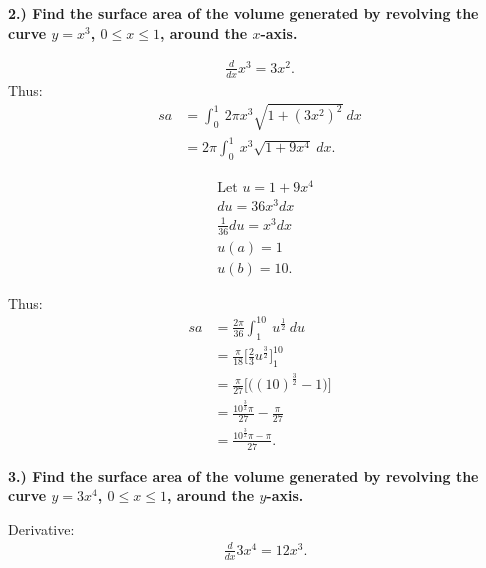 \documentclass{report}
\begin{document}
    \pagebreak \bigbreak \noindent 
    \begin{mdframed}
        \textbf{2.) Find the surface area of the volume generated by revolving the curve \(y = x^3\), \(0 \leq x \leq 1\), around the \(x\)-axis.}
    \end{mdframed}
    \bigbreak \noindent 
    \begin{align*}
        \frac{d}{dx}x^{3} = 3x^{2}
    .\end{align*}
    \bigbreak \noindent 
    Thus:
    \begin{align*}
        sa &= \int_{0}^{1}\ 2\pi x^{3}\sqrt{1+(3x^{2})^{2}}\ dx \\
           &= 2\pi\int_{0}^{1}\ x^{3}\sqrt{1+9x^{4}}\ dx
    .\end{align*}
    \begin{minipage}[]{0.47\textwidth}
        \begin{align*}
            &\text{Let $u=1+9x^{4}$} \\
            &du = 36x^{3}dx \\
            &\frac{1}{36}du = x^{3}dx \\
            &u(a) = 1 \\
            &u(b) = 10
        .\end{align*}
    \end{minipage}
    \begin{minipage}[]{0.47\textwidth}
        Thus:
        \begin{align*}
            sa &= \frac{2\pi}{36}\int_{1}^{10}\ u^\frac{1}{2}\ du \\
               &=\frac{\pi}{18}\bigg[\frac{2}{3}u^{\frac{3}{2}}\bigg]_1^{10} \\
               &=\frac{\pi}{27}\bigg[\bigg((10)^{\frac{3}{2}}-1\bigg)\bigg] \\
               &=\frac{10^{\frac{3}{2}}\pi}{27} - \frac{\pi}{27} \\
               &= \frac{10^{\frac{3}{2}}\pi-\pi}{27}
        .\end{align*}
    \end{minipage}
    \bigbreak \noindent 
    \begin{mdframed}
        \textbf{3.) Find the surface area of the volume generated by revolving the curve \(y = 3x^4\), \(0 \leq x \leq 1\), around the \(y\)-axis.}
    \end{mdframed}
    \bigbreak \noindent 
    \begin{minipage}[]{0.47\textwidth}
        Derivative:
        \begin{align*}
            &\frac{d}{dx}3x^{4} = 12x^{3}
        .\end{align*}
    \end{minipage}
\end{document}
